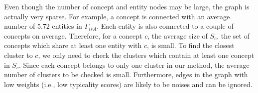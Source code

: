 Even though the number of concept and entity nodes may be large,
the graph is actually very sparse.
For example, a concept is connected with an average
number of 5.72 entities in $\Gamma_{isA}$. Each entity is also connected to a couple of concepts on average.
Therefore, for a concept $c$, the average size of $S_c$,
the set of concepts which share at least
one entity with $c$, is small.
To find the closest cluster to $c$,
we only need to check the clusters which contain at
least one concept in $S_c$. Since each concept belongs to only one
cluster in our method, the average number of clusters to be checked is small.
Furthermore, edges in the graph with low weights (i.e., low typicality scores)
are likely to be noises and can be ignored.
%


